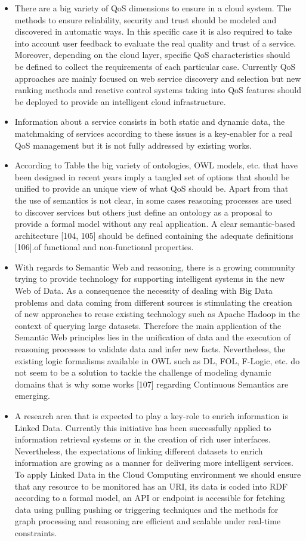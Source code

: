 \begin{itemize}
 \item There are a big variety of QoS dimensions to ensure in a cloud system. The methods to ensure reliability, security and trust should be modeled and discovered in automatic ways. In this specific case it is also required to take into account user feedback to evaluate the real quality and trust of a service. Moreover, depending on the cloud layer, specific QoS characteristics should be defined to collect the requirements of each particular case. Currently QoS approaches are mainly focused on web service discovery and selection but new ranking methods and reactive control systems taking into QoS features should be deployed to provide an intelligent cloud infrastructure.  
 \item Information about a service consists in both static and dynamic data, the matchmaking of services according to these issues is a key-enabler for a real QoS management but it is not fully addressed by existing works.
 \item According to Table  the big variety of ontologies, OWL models, etc. that have been designed in recent years imply a tangled set of options that should be unified to provide an unique view of  what QoS should be. Apart from that the use of semantics is not clear, in some cases reasoning processes are used to discover services but others just define an ontology as a proposal to provide a formal model without any real application. A clear semantic-based architecture [104, 105] should be defined containing the adequate definitions [106].of functional and non-functional properties.
 \item With regards to Semantic Web and reasoning, there is a growing community trying to provide technology for supporting intelligent systems in the new Web of Data. As a consequence the necessity of dealing with Big Data problems and data coming from different sources is stimulating the creation of new approaches to reuse existing technology such as Apache Hadoop in the context of querying large datasets. Therefore the main application of the Semantic Web principles lies in the unification of data and the execution of reasoning processes to validate data and infer new facts. Nevertheless, the existing logic formalisms available in OWL such as DL, FOL, F-Logic, etc. do not seem to be a solution to tackle the challenge of modeling dynamic domains that is why some works [107] regarding Continuous Semantics are emerging.
 \item A research area that is expected to play a key-role to enrich information is Linked Data. Currently this initiative has been successfully applied to information retrieval systems or in the creation of rich user interfaces. Nevertheless, the expectations of linking different datasets to enrich information are growing as a manner for delivering more intelligent services. To apply Linked Data in the Cloud Computing environment we should ensure that any resource to be monitored has an URI, its data is coded into RDF according to a formal model, an API or endpoint is accessible for fetching data using pulling pushing or triggering techniques and the methods for graph processing and reasoning are efficient and scalable under real-time constraints.

\end{itemize}
